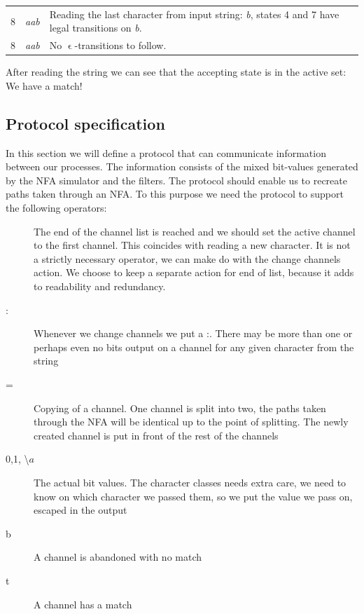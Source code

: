 \begin{example}
\begin{center}
\begin{tabular}{ccp{8.5cm}}
8 & \textsl{aab\underline{ }} & Reading the last character from input
string: \textsl{b}, states 4 and 7 have legal transitions on
\textsl{b}. \\

8 & \textsl{aab\underline{ }} & No $\upvarepsilon$-transitions to follow.

\end{tabular}
\end{center}

After reading the string we can see that the accepting state is in the
active set: We have a match!

\end{example}


\subsection{Protocol specification}
\label{sec:protocol_spec}

In this section we will define a protocol that can communicate
information between our processes. The information consists of the
mixed bit-values generated by the NFA simulator and the filters. The
protocol should enable us to recreate paths taken through an NFA. To
this purpose we need the protocol to support the following operators:

\begin{description}
  \item[\textbar] The end of the channel list is reached and we should
    set the active channel to the first channel. This coincides with
    reading a new character. It is not a strictly necessary operator,
    we can make do with the change channels action. We choose to keep
    a separate action for end of list, because it adds to readability
    and redundancy.
  \item[:] Whenever we change channels we put a :. There may be more
    than one or perhaps even no bits output on a channel for any given
    character from the string
  \item[=] Copying of a channel. One channel is split into two, the
    paths taken through the NFA will be identical up to the point of
    splitting. The newly created channel is put in front of the rest
    of the channels
  \item[0,1, \textbackslash $a$] The actual bit values. The character
    classes needs extra care, we need to know on which character we
    passed them, so we put the value we pass on, escaped in the output
  \item[b] A channel is abandoned with no match
  \item[t] A channel has a match
\end{description}

